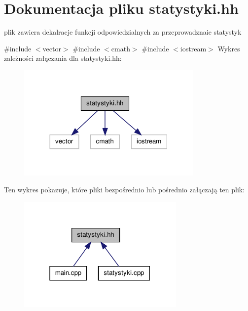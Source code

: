 \hypertarget{statystyki_8hh}{\section{\-Dokumentacja pliku statystyki.\-hh}
\label{statystyki_8hh}
}


plik zawiera dekalracje funkcji odpowiedzialnych za przeprowadznaie statystyk  


{\ttfamily \#include $<$vector$>$}\*
{\ttfamily \#include $<$cmath$>$}\*
{\ttfamily \#include $<$iostream$>$}\*
\-Wykres zależności załączania dla statystyki.\-hh\-:\nopagebreak
\begin{figure}[H]
\begin{center}
\leavevmode
\includegraphics[width=258pt]{statystyki_8hh__incl}
\end{center}
\end{figure}
\-Ten wykres pokazuje, które pliki bezpośrednio lub pośrednio załączają ten plik\-:\nopagebreak
\begin{figure}[H]
\begin{center}
\leavevmode
\includegraphics[width=232pt]{statystyki_8hh__dep__incl}
\end{center}
\end{figure}
